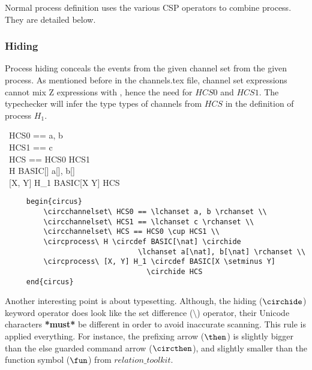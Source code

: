 \documentclass{article}
\begin{document}
Normal process definition uses the various CSP operators to combine process.
They are detailed below.

\subsubsection{Hiding}

Process hiding conceals the events from the given channel set from the given process.
As mentioned before in the \textsf{channels.tex} file, channel set expressions cannot
mix Z expressions with , hence the need for $HCS0$ and $HCS1$.
The typechecker will infer the type types of channels from $HCS$ in the definition of process $H_1$.
%
\begin{circus}
    \circchannelset\ HCS0 == \lchanset a, b \rchanset \\ %
    \circchannelset\ HCS1 == \lchanset c \rchanset \\
    \circchannelset\ HCS == HCS0 \cup HCS1 \\
    \circprocess\ H \circdef BASIC[\nat] \circhide \lchanset a[\nat], b[\nat] \rchanset \\
    \circprocess\ [X, Y] H_1 \circdef BASIC[X \setminus Y] \circhide HCS
\end{circus}
%
\begin{verbatim}
     begin{circus}
         \circchannelset\ HCS0 == \lchanset a, b \rchanset \\
         \circchannelset\ HCS1 == \lchanset c \rchanset \\
         \circchannelset\ HCS == HCS0 \cup HCS1 \\
         \circprocess\ H \circdef BASIC[\nat] \circhide
                               \lchanset a[\nat], b[\nat] \rchanset \\
         \circprocess\ [X, Y] H_1 \circdef BASIC[X \setminus Y]
                                 \circhide HCS
     end{circus}
\end{verbatim}
%
Another interesting point is about typesetting. Although, the hiding ($\circhide$) keyword operator
does look like the set difference ($\setminus$) operator, their Unicode characters \textbf{*must*}
be different in order to avoid inaccurate scanning. This rule is applied everything. For instance,
the prefixing arrow ($\then$) is slightly bigger than the else guarded command arrow ($\circthen$),
and slightly smaller than the function symbol ($\fun$) from $relation\_toolkit$.
\end{document}
